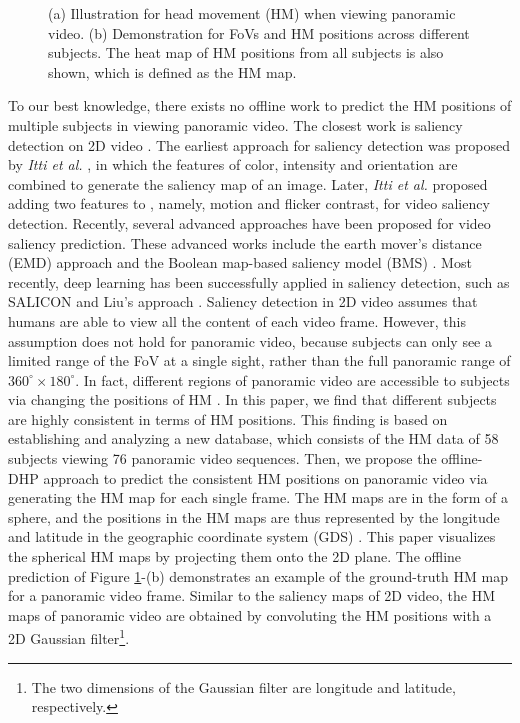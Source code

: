 \documentclass[10pt,journal,compsoc]{IEEEtran}
\begin{document}
\begin{figure}
	\begin{center}

        \vspace{-.5em}
		\caption{\footnotesize{(a) Illustration for head movement (HM) when viewing panoramic video. (b) Demonstration for FoVs and HM positions across different subjects. The heat map of HM positions from all subjects is also shown, which is defined as the HM map.}}
		\label{fig-one}
	\end{center}
\vspace{-2em}
\end{figure}

To our best knowledge, there exists no offline work to predict the HM positions of multiple subjects in viewing panoramic video. The closest work is saliency detection on 2D video \cite{borji2013state}. The earliest approach for saliency detection was proposed by \textit{Itti et al.} \cite{itti1998model}, in which the features of color, intensity and orientation are combined to generate the saliency map of an image. Later, \textit{Itti et al.} \cite{itti2004automatic} proposed adding two features to \cite{itti1998model}, namely, motion and flicker contrast, for video saliency detection. Recently, several advanced approaches have been proposed for video saliency prediction. These advanced works include  the earth mover's distance (EMD) approach \cite{lin2013visual} and the Boolean map-based saliency model (BMS) \cite{zhang2016exploiting}.
Most recently, deep learning has been successfully applied in saliency detection,
such as SALICON \cite{huang2015salicon} and Liu's approach \cite{Liu2017cvpr}.
Saliency detection in 2D video assumes that humans are able to view all the content of each video frame.
However, this assumption does not hold for panoramic video, because subjects can only see a limited range of the FoV at a single sight, rather than the full panoramic range of $360^{\circ} \times 180^{\circ}$.
In fact, different regions of panoramic video are accessible to subjects via changing the positions of HM \cite{lowe2015visualization}.
In this paper, we find that different subjects are highly consistent in terms of HM positions.
This finding is based on establishing and analyzing a new database, which consists of the HM data of 58 subjects viewing 76 panoramic video sequences.
Then, we propose the offline-DHP approach to predict the consistent HM positions on panoramic video via generating the HM map for each single frame.
The HM maps are in the form of a sphere, and the positions in the HM maps are thus represented by the longitude and latitude in the geographic coordinate system (GDS) \cite{Goodchild2007}. This paper visualizes the spherical HM maps by projecting them onto the 2D plane.
The offline prediction of Figure \ref{fig-one}-(b) demonstrates an example of the ground-truth HM map for a panoramic video frame. Similar to the saliency maps of 2D video, the HM maps of panoramic video are obtained by convoluting the HM positions with a 2D Gaussian filter\footnote{The two dimensions of the Gaussian filter are longitude and latitude, respectively.}.
\end{document}
